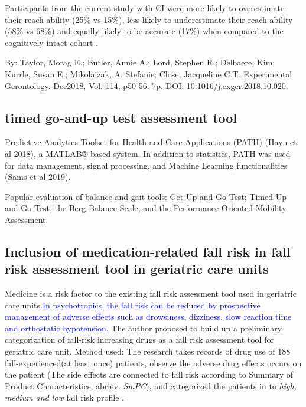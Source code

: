 \documentclass{article}
\begin{document}
Participants from the current study with CI were more likely to overestimate their reach ability (25\% vs 15\%), less likely to underestimate their reach ability (58\% vs 68\%) and equally likely to be accurate (17\%) 
when compared to the cognitively intact cohort \cite{Taylor_2018}.

By: Taylor, Morag E.; Butler, Annie A.; Lord, Stephen R.; Delbaere, Kim; Kurrle, Susan E.; Mikolaizak, A. Stefanie; Close, Jacqueline C.T. Experimental Gerontology. Dec2018, Vol. 114, p50-56. 7p. DOI: 10.1016/j.exger.2018.10.020.

\subsection{timed go-and-up test assessment tool}

Predictive Analytics Toolset for Health and Care Applications (PATH) (Hayn et al 2018), a MATLAB® based system. In addition to statistics, PATH was used for data management, signal processing, and Machine Learning functionalities (Sams et al 2019). \cite{Ziegl_2020}

Popular evaluation of balance and gait tools:
Get Up and Go Test; Timed Up and Go Test, the Berg Balance Scale, and the Performance‐Oriented Mobility Assessment\cite{PreventionofFalls2011}.

\subsection{Inclusion of medication-related fall risk in fall risk assessment tool in geriatric care units}
Medicine is a risk factor to the existing fall risk assessment tool used in geriatric care units.\textcolor{blue}{In psychotropics, the fall risk can be reduced by prospective management of adverse effects such as drowsiness, dizziness, slow reaction time and orthostatic hypotension.} The author proposed to build up a preliminary categorization of fall-risk increasing drugs as a fall risk assessment tool for geriatric care unit. Method used: The research takes records of drug use of 188 fall-experienced(at least once) patients, observe the adverse drug effects occurs on the patient (The side effects are connected to fall risk according to Summary of Product Characteristics, abriev. \emph{SmPC}), and categorized the patients in to \emph{high, medium and low} fall risk profile .
\end{document}
